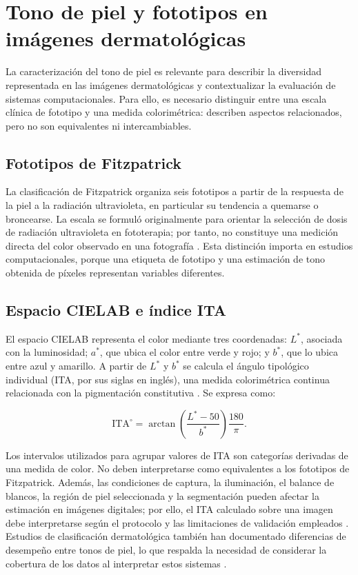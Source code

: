 \section{Tono de piel y fototipos en imágenes dermatológicas}

La caracterización del tono de piel es relevante para describir la diversidad representada en las imágenes dermatológicas y contextualizar la evaluación de sistemas computacionales. Para ello, es necesario distinguir entre una escala clínica de fototipo y una medida colorimétrica: describen aspectos relacionados, pero no son equivalentes ni intercambiables.

\subsection{Fototipos de Fitzpatrick}

La clasificación de Fitzpatrick organiza seis fototipos a partir de la respuesta de la piel a la radiación ultravioleta, en particular su tendencia a quemarse o broncearse. La escala se formuló originalmente para orientar la selección de dosis de radiación ultravioleta en fototerapia; por tanto, no constituye una medición directa del color observado en una fotografía \parencite{fitzpatrick1988validity}. Esta distinción importa en estudios computacionales, porque una etiqueta de fototipo y una estimación de tono obtenida de píxeles representan variables diferentes.

\subsection{Espacio CIELAB e índice ITA}

El espacio CIELAB representa el color mediante tres coordenadas: $L^*$, asociada con la luminosidad; $a^*$, que ubica el color entre verde y rojo; y $b^*$, que lo ubica entre azul y amarillo. A partir de $L^*$ y $b^*$ se calcula el ángulo tipológico individual (ITA, por sus siglas en inglés), una medida colorimétrica continua relacionada con la pigmentación constitutiva \parencite{delbino2013variations}. Se expresa como:

\begin{equation}
\mathrm{ITA}^{\circ} =
\arctan\left(\frac{L^* - 50}{b^*}\right)
\frac{180}{\pi}.
\label{eq:ita}
\end{equation}

Los intervalos utilizados para agrupar valores de ITA son categorías derivadas de una medida de color. No deben interpretarse como equivalentes a los fototipos de Fitzpatrick. Además, las condiciones de captura, la iluminación, el balance de blancos, la región de piel seleccionada y la segmentación pueden afectar la estimación en imágenes digitales; por ello, el ITA calculado sobre una imagen debe interpretarse según el protocolo y las limitaciones de validación empleados \parencite{alipour2026italimitations}. Estudios de clasificación dermatológica también han documentado diferencias de desempeño entre tonos de piel, lo que respalda la necesidad de considerar la cobertura de los datos al interpretar estos sistemas \parencite{daneshjou2022disparities}.

